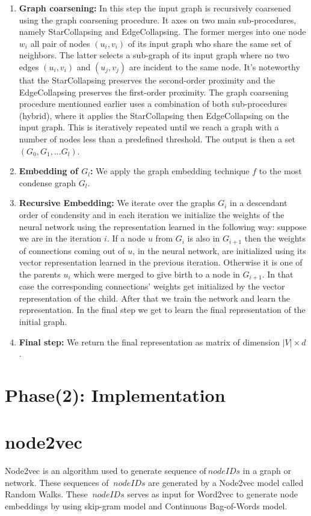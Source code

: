 \documentclass[a4paper,13pt]{article}
\begin{document}
\begin{enumerate}
    \item \textbf{Graph coarsening:} In this step the input graph is recursively coarsened using the graph coarsening procedure. It axes on two main sub-procedures, namely StarCollapsing and EdgeCollapsing. The former merges into one node $w_i$ all pair of nodes $(u_i,v_i)$ of its input graph who share the same set of neighbors. The latter selects a sub-graph of its input graph where no two edges $(u_i,v_i)$ and $(u_j,v_j)$ are incident to the same node. It’s noteworthy that the StarCollapsing preserves the second-order proximity and the EdgeCollapsing preserves the first-order proximity. The graph coarsening procedure mentionned earlier uses a combination of both sub-procedures (hybrid), where it applies the StarCollapsing then EdgeCollapsing on the input graph. This is iteratively repeated until we reach a graph with a number of nodes less than a predefined threshold. The output is then a set $(G_0,G_1,...G_l)$.
    \item \textbf{Embedding of $G_l$:} We apply the graph embedding technique $f$ to the most condense graph $G_l$.
    \item \textbf{Recursive Embedding:} We iterate over the graphs $G_i$ in a descendant order of condensity and in each iteration we initialize the weights of the neural network using the representation learned in the following way: suppose we are in the iteration $i$. If a node $u$ from $G_i$ is also in $G_{i+1}$ then the weights of connections coming out of $u$, in the neural network, are initialized using its vector representation learned in the previous iteration. Otherwise it is one of the parents $u_i$ which were merged to give birth to a node in $G_{i+1}$. In that case the corresponding connections’ weights get initialized by the vector representation of the child. After that we train the network and learn the representation. In the final step we get to learn the final representation of the initial graph.
    \item \textbf{Final step:} We return the final representation as matrix of dimension $|V|\times d$.
\end{enumerate}

\section*{Phase(2): Implementation}

\section{node2vec} 
Node2vec is an algorithm used to generate sequence of$\ node IDs $ in a graph or network. These sequences of $\ node IDs $ are generated by a Node2vec model called Random Walks. These $\ node IDs $ serves as input for Word2vec to generate node embeddings by using skip-gram model and Continuous Bag-of-Words model.
\end{document}
